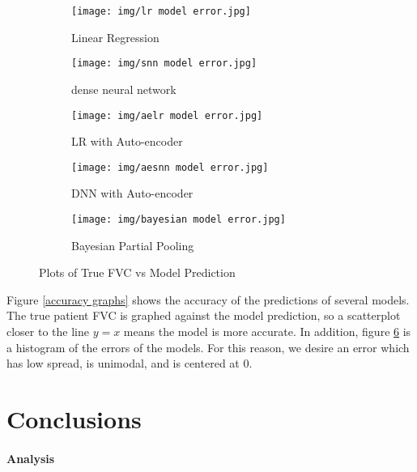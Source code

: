 \documentclass[12pt]{article}
\begin{document}
\begin{figure}[h!]
    \centering

    \begin{subfigure}{.32\textwidth}
        \centering
        \texttt{[image: img/lr model error.jpg]}
        \caption{Linear Regression}
        \label{error:lr}
    \end{subfigure}
    \begin{subfigure}{.32\textwidth}
        \centering
        \texttt{[image: img/snn model error.jpg]}
        \caption{dense neural network}
        \label{error:dnn}
    \end{subfigure}
    \begin{subfigure}{.32\textwidth}
        \centering
        \texttt{[image: img/aelr model error.jpg]}
        \caption{LR with Auto-encoder}
        \label{error:aelr}
    \end{subfigure}

    \vspace{0.5em}

    \begin{subfigure}{.33\textwidth}
        \centering
        \texttt{[image: img/aesnn model error.jpg]}
        \caption{DNN with Auto-encoder}
        \label{error:aednn}
    \end{subfigure}
    \begin{subfigure}{.33\textwidth}
        \centering
        \texttt{[image: img/bayesian model error.jpg]}
        \caption{Bayesian Partial Pooling}
        \label{error:bpp}
    \end{subfigure}

    \caption{Plots of True FVC vs Model Prediction}
    \label{error graphs}
\end{figure}

Figure \ref{accuracy graphs} shows the accuracy of the predictions of several models. 
The true patient FVC is graphed against the model prediction, so a scatterplot closer to the line $y=x$ means the model is more accurate.
In addition, figure \ref{error graphs} is a histogram of the errors of the models.
For this reason, we desire an error which has low spread, is unimodal, and is centered at 0.

\section{Conclusions}

\paragraph*{Analysis}
\end{document}
